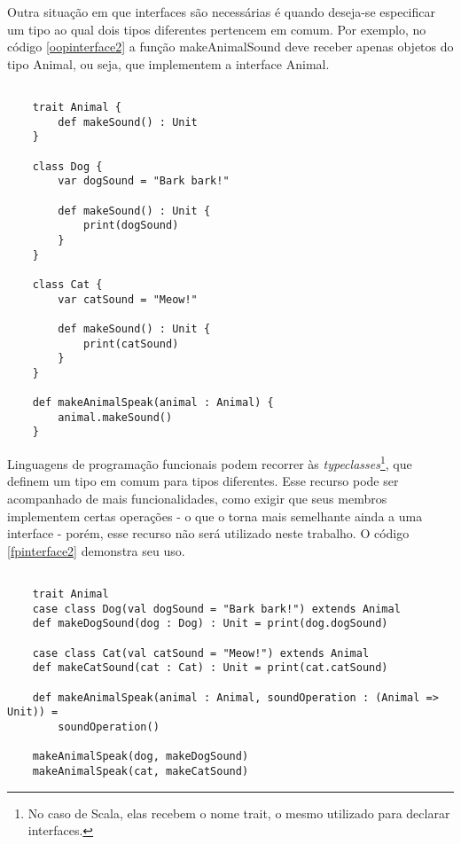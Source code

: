 
Outra situação em que interfaces são necessárias 
é quando deseja-se especificar um tipo ao qual 
dois tipos diferentes pertencem em comum. Por 
exemplo, no código \ref{oopinterface2} a função 
makeAnimalSound deve receber apenas objetos 
do tipo Animal, ou seja, que implementem 
a interface Animal.

\begin{lstlisting}[caption={Interfaces em Orientação a Objetos},label=oopinterface2]
    
    trait Animal {
        def makeSound() : Unit
    }

    class Dog {
        var dogSound = "Bark bark!"

        def makeSound() : Unit {
            print(dogSound)
        }
    }

    class Cat {
        var catSound = "Meow!"

        def makeSound() : Unit {
            print(catSound)
        }
    }

    def makeAnimalSpeak(animal : Animal) {
        animal.makeSound()
    }

\end{lstlisting}

Linguagens de programação funcionais podem 
recorrer às \textit{typeclasses}\footnote{
    No caso de Scala, elas recebem o nome trait, 
    o mesmo utilizado para declarar interfaces.
}, que definem um tipo em comum para tipos 
diferentes. Esse recurso pode ser acompanhado 
de mais funcionalidades, como exigir que seus 
membros implementem certas operações - o que 
o torna mais semelhante ainda a uma interface - 
porém, esse recurso não será utilizado neste 
trabalho. O código \ref{fpinterface2} demonstra 
seu uso.


\begin{lstlisting}[caption={Interfaces em Programação Funcional},label=fpinterface2]
    
    trait Animal
    case class Dog(val dogSound = "Bark bark!") extends Animal
    def makeDogSound(dog : Dog) : Unit = print(dog.dogSound)
    
    case class Cat(val catSound = "Meow!") extends Animal
    def makeCatSound(cat : Cat) : Unit = print(cat.catSound)

    def makeAnimalSpeak(animal : Animal, soundOperation : (Animal => Unit)) =
        soundOperation()
    
    makeAnimalSpeak(dog, makeDogSound)
    makeAnimalSpeak(cat, makeCatSound)

\end{lstlisting}


